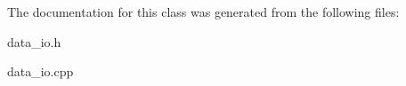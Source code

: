The documentation for this class was generated from the following files\+:\begin{DoxyCompactItemize}
\item 
data\+\_\+io.\+h\item 
data\+\_\+io.\+cpp\end{DoxyCompactItemize}
